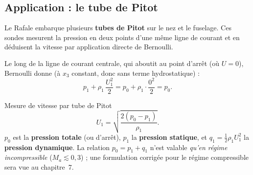 \documentclass[11pt,a4paper]{report}
\begin{document}
\subsection{Application : le tube de Pitot}

Le Rafale embarque plusieurs \textbf{tubes de Pitot} sur le nez et le fuselage.
Ces sondes mesurent la pression en deux points d'une même ligne de courant et en
déduisent la vitesse par application directe de Bernoulli.

\vspace{0.5cm}
\begin{center}
\end{center}
\vspace{0.3cm}

Le long de la ligne de courant centrale, qui aboutit au point d'arrêt (où
$U = 0$), Bernoulli donne (à $x_3$ constant, donc sans terme hydrostatique) :
\[
    p_1 + \rho_1\,\frac{U_1^2}{2} = p_0 + \rho_1\cdot\frac{0^2}{2} = p_0.
\]

\begin{importantbox}{Mesure de vitesse par tube de Pitot}
\[
    U_1 = \sqrt{\dfrac{2(p_0 - p_1)}{\rho_1}}.
\]
$p_0$ est la \textbf{pression totale} (ou d'arrêt), $p_1$ la \textbf{pression
statique}, et $q_1 = \tfrac{1}{2}\rho_1 U_1^2$ la \textbf{pression dynamique}.
La relation $p_0 = p_1 + q_1$ n'est valable \emph{qu'en régime incompressible}
($M_a \lesssim 0{,}3$) ; une formulation corrigée pour le régime compressible
sera vue au chapitre~7.
\end{importantbox}
\end{document}
